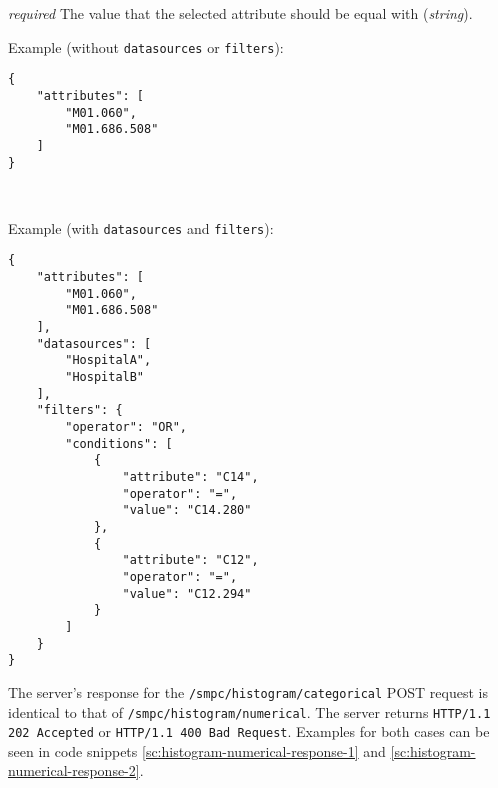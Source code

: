 \begin{description}[labelwidth=5em, leftmargin=\dimexpr\labelwidth+\labelsep\relax]
\begin{description}[labelwidth=6em, leftmargin=\dimexpr\labelwidth+\labelsep\relax]
\begin{description}[labelwidth=6em, leftmargin=\dimexpr\labelwidth+\labelsep\relax]
\begin{description}[labelwidth=5em, leftmargin=\dimexpr\labelwidth+\labelsep\relax]
            \item[\texttt{value}:] {\color{red}\textit{required}} The value that the selected attribute should be equal with (\textit{string}).
        \end{description}

    \end{description}
\end{description}

\begin{minipage}{\linewidth}
  Example (without \texttt{datasources} or \texttt{filters}):
{
\begin{verbatim}
{
    "attributes": [
        "M01.060",
        "M01.686.508"
    ]
}
\end{verbatim}
\label{sc:histogram-categorical-post-1}
}
\end{minipage}

\ \\
\begin{minipage}{\linewidth}
  Example (with \texttt{datasources} and \texttt{filters}):
{
\begin{verbatim}
{
    "attributes": [
        "M01.060",
        "M01.686.508"
    ],
    "datasources": [
        "HospitalA",
        "HospitalB"
    ],
    "filters": {
        "operator": "OR",
        "conditions": [
            {
                "attribute": "C14",
                "operator": "=",
                "value": "C14.280"
            },
            {
                "attribute": "C12",
                "operator": "=",
                "value": "C12.294"
            }
        ]
    }
}
\end{verbatim}
\label{sc:histogram-categorical-post-2}
}
\end{minipage}

\item[Response:] The server's response for the \texttt{/smpc/histogram/categorical} POST request is identical to that of \texttt{/smpc/histogram/numerical}. The server returns \texttt{HTTP/1.1 202 Accepted} or \texttt{HTTP/1.1 400 Bad Request}. Examples for both cases can be seen in code snippets \ref{sc:histogram-numerical-response-1} and \ref{sc:histogram-numerical-response-2}.
 \end{description}



